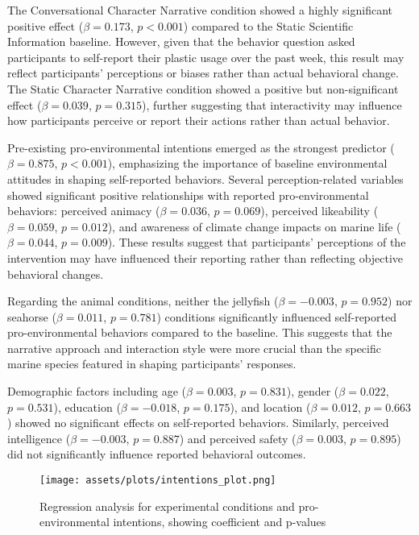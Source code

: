 \documentclass[sigconf, nonacm]{acmart}
\begin{document}
The Conversational Character Narrative condition showed a highly significant positive effect ($\beta = 0.173$, $p < 0.001$) compared to the Static Scientific Information baseline. However, given that the behavior question asked participants to self-report their plastic usage over the past week, this result may reflect participants' perceptions or biases rather than actual behavioral change. The Static Character Narrative condition showed a positive but non-significant effect ($\beta = 0.039$, $p = 0.315$), further suggesting that interactivity may influence how participants perceive or report their actions rather than actual behavior.

Pre-existing pro-environmental intentions emerged as the strongest predictor ($\beta = 0.875$, $p < 0.001$), emphasizing the importance of baseline environmental attitudes in shaping self-reported behaviors. Several perception-related variables showed significant positive relationships with reported pro-environmental behaviors: perceived animacy ($\beta = 0.036$, $p = 0.069$), perceived likeability ($\beta = 0.059$, $p = 0.012$), and awareness of climate change impacts on marine life ($\beta = 0.044$, $p = 0.009$). These results suggest that participants' perceptions of the intervention may have influenced their reporting rather than reflecting objective behavioral changes.

Regarding the animal conditions, neither the jellyfish ($\beta = -0.003$, $p = 0.952$) nor seahorse ($\beta = 0.011$, $p = 0.781$) conditions significantly influenced self-reported pro-environmental behaviors compared to the baseline. This suggests that the narrative approach and interaction style were more crucial than the specific marine species featured in shaping participants' responses.

Demographic factors including age ($\beta = 0.003$, $p = 0.831$), gender ($\beta = 0.022$, $p = 0.531$), education ($\beta = -0.018$, $p = 0.175$), and location ($\beta = 0.012$, $p = 0.663$) showed no significant effects on self-reported behaviors. Similarly, perceived intelligence ($\beta = -0.003$, $p = 0.887$) and perceived safety ($\beta = 0.003$, $p = 0.895$) did not significantly influence reported behavioral outcomes.
\begin{figure}
    \centering
    \texttt{[image: assets/plots/intentions\_plot.png]}
    \caption{Regression analysis for experimental conditions and pro-environmental intentions, showing coefficient and p-values}
    \label{fig:intentions_post}
\end{figure}
\end{document}

